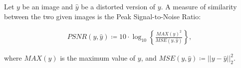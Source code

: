 \label{sec:psnr}
Let $y$ be an image and $\hat{y}$ be a distorted version of $y$.
A measure of similarity between the two given images is the Peak Signal-to-Noise Ratio:

\begin{align}
    PSNR(y, \hat{y}) \coloneqq 10 \cdot \log_{10} \left\{ \frac{MAX(y)^2}{MSE(y, \hat{y})} \right\},
\end{align}

where $MAX(y)$ is the maximum value of $y$, and $MSE(y, \hat{y}) \coloneqq || y - \hat{y} ||^2_2$.
